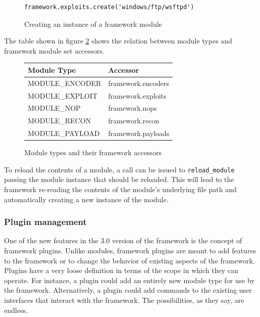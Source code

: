 \documentclass{report}
\begin{document}
\begin{figure}[h]
\begin{verbatim}
framework.exploits.create('windows/ftp/wsftpd')
\end{verbatim}
\caption{Creating an instance of a framework module}
\label{fig-code-framework-modcreate}
\end{figure}

\par
The table shown in figure \ref{fig-table-modulsets} shows the
relation between module types and framework module set accessors.

\begin{figure}[h]
\begin{center}
\begin{tabular}{|l|l|}
\hline
\textbf{Module Type} & \textbf{Accessor} \\
\hline
MODULE\_ENCODER & framework.encoders \\
MODULE\_EXPLOIT & framework.exploits \\
MODULE\_NOP & framework.nops \\
MODULE\_RECON & framework.recon \\
MODULE\_PAYLOAD & framework.payloads \\
\hline
\end{tabular}
\caption{Module types and their framework accessors}
\label{fig-table-modulsets}
\end{center}
\end{figure}

\par
To reload the contents of a module, a call can be issued to
\texttt{reload\_module} passing the module instance that should be
reloaded.  This will lead to the framework re-reading the contents
of the module's underlying file path and automatically creating a
new instance of the module.

            \subsubsection{Plugin management}

\par
One of the new features in the 3.0 version of the framework is the
concept of framework plugins.  Unlike modules, framework plugins are
meant to add features to the framework or to change the behavior of
existing aspects of the framework.  Plugins have a very loose
definition in terms of the scope in which they can operate.  For
instance, a plugin could add an entirely new module type for use by
the framework.  Alternatively, a plugin could add commands to the
existing user interfaces that interact with the framework.  The
possibilities, as they say, are endless.
\end{document}
